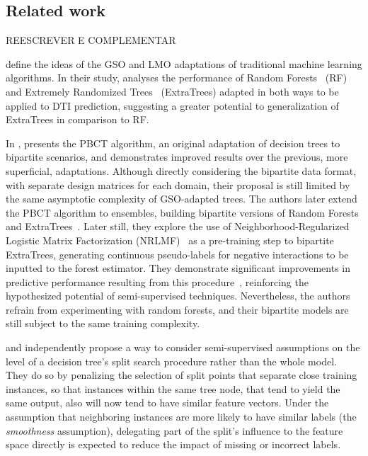 \begin{itemize}


\section{Related work}
\label{sec:related_work}

REESCREVER E COMPLEMENTAR  %


 define the ideas of the GSO and LMO adaptations of traditional machine learning algorithms. In their study, \cite{schrynemackers2015classifying} analyses the performance of Random Forests~\cite{breiman2001random} (RF) and Extremely Randomized Trees~\cite{geurts2006extremely} (ExtraTrees) adapted in both ways to be applied to DTI prediction, suggesting a greater potential to generalization of ExtraTrees in comparison to RF.

In \citeyear{pliakos2018global},  presents the PBCT algorithm, an original adaptation of decision trees to bipartite scenarios, and demonstrates improved results over the previous, more superficial, adaptations. Although directly considering the bipartite data format, with separate design matrices for each domain, their proposal is still limited by the same asymptotic complexity of GSO-adapted trees.
The authors later extend the PBCT algorithm to ensembles, building bipartite versions of Random Forests and ExtraTrees~\cite{pliakos2019network}. Later still, they explore the use of Neighborhood-Regularized Logistic Matrix Factorization (NRLMF)~\cite{liu2016neighborhood} as a pre-training step to bipartite ExtraTrees, generating continuous pseudo-labels for negative interactions to be inputted to the forest estimator. They demonstrate significant improvements in predictive performance resulting from this procedure~\cite{pliakos2019network}, reinforcing the hypothesized potential of semi-supervised techniques. Nevertheless, the authors refrain from experimenting with random forests, and their bipartite models are still subject to the same training complexity.

\cite{levatic2017semisupervised} and {} independently propose a way to consider semi-supervised assumptions on the level of a decision tree's split search procedure rather than the whole model. They do so by penalizing the selection of split points that separate close training instances, so that instances within the same tree node, that tend to yield the same output, also will now tend to have similar feature vectors. Under the assumption that neighboring instances are more likely to have similar labels (the \emph{smoothness} assumption), delegating part of the split's influence to the feature space directly is expected to reduce the impact of missing or incorrect labels. 


\end{itemize}
